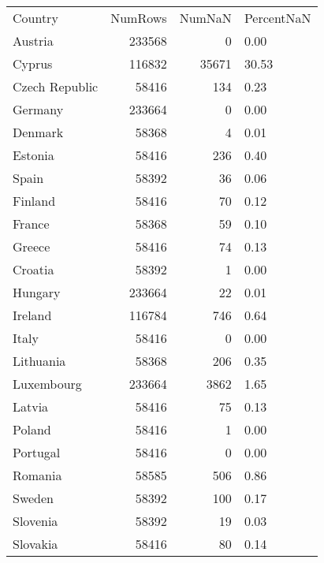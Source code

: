 \begin{tabular}{lrrl}
Country & NumRows & NumNaN & PercentNaN \\
Austria & 233568 & 0 & 0.00 \\
Cyprus & 116832 & 35671 & 30.53 \\
Czech Republic & 58416 & 134 & 0.23 \\
Germany & 233664 & 0 & 0.00 \\
Denmark & 58368 & 4 & 0.01 \\
Estonia & 58416 & 236 & 0.40 \\
Spain & 58392 & 36 & 0.06 \\
Finland & 58416 & 70 & 0.12 \\
France & 58368 & 59 & 0.10 \\
Greece & 58416 & 74 & 0.13 \\
Croatia & 58392 & 1 & 0.00 \\
Hungary & 233664 & 22 & 0.01 \\
Ireland & 116784 & 746 & 0.64 \\
Italy & 58416 & 0 & 0.00 \\
Lithuania & 58368 & 206 & 0.35 \\
Luxembourg & 233664 & 3862 & 1.65 \\
Latvia & 58416 & 75 & 0.13 \\
Poland & 58416 & 1 & 0.00 \\
Portugal & 58416 & 0 & 0.00 \\
Romania & 58585 & 506 & 0.86 \\
Sweden & 58392 & 100 & 0.17 \\
Slovenia & 58392 & 19 & 0.03 \\
Slovakia & 58416 & 80 & 0.14 \\
\end{tabular}
